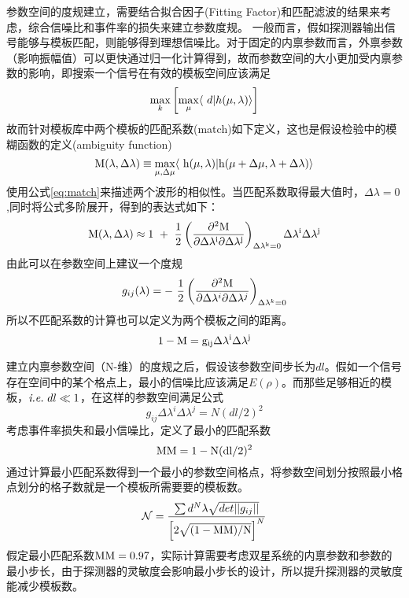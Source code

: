 参数空间的度规建立，需要结合拟合因子(Fitting Factor)和匹配滤波的结果来考虑，综合信噪比和事件率的损失来建立参数度规。
一般而言，假如探测器输出信号能够与模板匹配，则能够得到理想信噪比。对于固定的内禀参数而言，外禀参数（影响振幅值）可以更快通过归一化计算得到，故而参数空间的大小更加受内禀参数的影响，即搜索一个信号在有效的模板空间应该满足
\begin{equation}
\mathop{\rm max}\limits_{k}   \left [ \mathop{\rm max}\limits_{\mu} \langle \ d | h(\mu,\lambda) \rangle \right ]
\end{equation}
故而针对模板库中两个模板的匹配系数(match)如下定义，这也是假设检验中的模糊函数的定义(ambiguity function)\cite{owen1996search}
\begin{equation}
\rm M(\lambda, \Delta \lambda) \equiv  \mathop{\rm max}\limits_{\mu,\Delta \mu} \langle \ h(\mu,\lambda)  | h(\mu +\Delta \mu ,\lambda+\Delta \lambda) \rangle 
\label{eq:match}
\end{equation}
使用公式\ref{eq:match}来描述两个波形的相似性。当匹配系数取得最大值时，$\Delta \lambda =0$,同时将公式多阶展开，得到的表达式如下：
\begin{equation}
\rm M(\lambda, \Delta \lambda) \approx 1 \ + \ \frac{1}{2} \left( \frac{\partial^2 \rm M }{\partial \Delta \lambda^i \partial \Delta \lambda^j} \right)_{\Delta \lambda^k=0}\Delta \lambda^i \Delta \lambda^j
\end{equation}
由此可以在参数空间上建议一个度规
\begin{equation}
g_{ij}(\lambda) =-  \ \frac{1}{2} \left( \frac{\partial^2 \rm M }{\partial \Delta \lambda^i \partial \Delta \lambda^j} \right)_{\Delta \lambda^k=0}
\end{equation}
所以不匹配系数的计算也可以定义为两个模板之间的距离。
\begin{equation}
1-\rm M = g_{ij}\Delta \lambda^i \Delta \lambda^j
\end{equation}

建立内禀参数空间（N-维）的度规之后，假设该参数空间步长为$dl$。假如一个信号存在空间中的某个格点上，最小的信噪比应该满足$E(\rho)$。而那些足够相近的模板，$\emph{i.e.} \ dl \ll 1 $，在这样的参数空间满足公式
\begin{equation}
g_{ij}\Delta \lambda^i \Delta \lambda^j= N(dl/2)^2
\end{equation}
考虑事件率损失和最小信噪比，定义了最小的匹配系数
\begin{equation}
\rm MM = 1 - N(dl/2)^2
\end{equation}
通过计算最小匹配系数得到一个最小的参数空间格点，将参数空间划分按照最小格点划分的格子数就是一个模板所需要要的模板数。
\begin{equation}
\mathcal{N} = \frac{\sum d^N \lambda \sqrt{det||g_{ij}||}}{\left[ 2\sqrt{(1-\rm MM)/N} \right]^N}
\end{equation}
假定最小匹配系数$\rm MM=0.97$，实际计算需要考虑双星系统的内禀参数和参数的最小步长，由于探测器的灵敏度会影响最小步长的设计，所以提升探测器的灵敏度能减少模板数。

